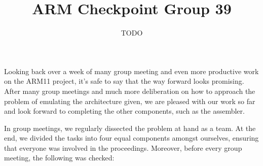 \documentclass[11pt]{article}
\begin{document}
\title{ARM Checkpoint Group 39}
\author{TODO}

\maketitle

Looking back over a week of many group meeting and even more productive work on the ARM11 project, it’s safe to say that the way forward looks promising. After many group meetings and much more deliberation on how to approach the problem of emulating the architecture given, we are pleased with our work so far and look forward to completing the other components, such as the assembler.

In group meetings, we regularly dissected the problem at hand as a team. At the end, we divided the tasks into four equal components amongst ourselves, ensuring that everyone was involved in the proceedings. Moreover, before every group meeting, the following was checked:
\end{document}
